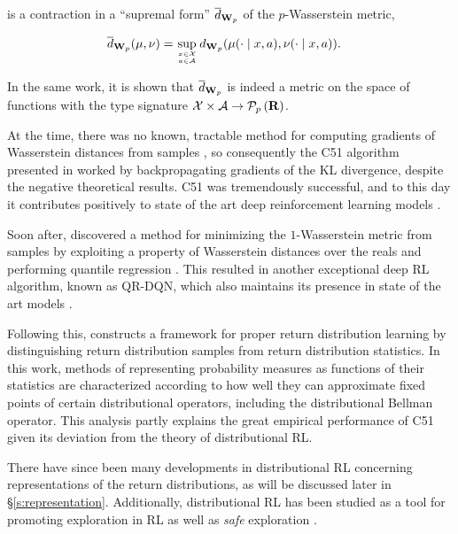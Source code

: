 is a contraction in a ``supremal form'' $\supremalwassermetric[p]$
of the $p$-Wasserstein metric,

\begin{align*}
  \supremalwassermetric[p](\mu, \nu) &= \sup_{x\in\mathcal{X}\atop
                                          a\in\mathcal{A}}\wassermetric[p](\mu(\cdot\mid
                                          x, a),\nu(\cdot\mid x, a)).
\end{align*}

In the same work, it is shown that $\supremalwassermetric[p]$ is
indeed a metric on the space of functions with the type signature
$\mathcal{X}\times\mathcal{A}\to\probset{\mathbf{R}}$.

At the time, there was no known, tractable method for computing
gradients of Wasserstein distances from samples
\citep{bellemare2017cramer}, so consequently the C51 algorithm
presented in \citet{Bellemare2017ADP} worked by backpropagating
gradients of the KL divergence, despite the negative theoretical
results. C51 was tremendously successful, and to this day it
contributes positively to state of the art deep reinforcement learning
models \citep{hessel2018rainbow}.

Soon after, \citet{Dabney2018DistributionalRL} discovered a method for
minimizing the
$1$-Wasserstein metric from samples by exploiting a property of Wasserstein
distances over the reals \citep[Theorem 2.1]{thorpeintroduction} and
performing quantile regression \citep{koenker1978regression}. This
resulted in another exceptional deep RL algorithm, known as QR-DQN,
which also maintains its presence in state of the art models
\citep{bellemare2020autonomous}.

Following this, \citet{Rowland48495} constructs a framework for proper
return distribution learning by distinguishing return distribution
samples from return distribution statistics. In this work, methods
of representing probability measures as functions of their statistics
are characterized according to how well they can approximate fixed
points of certain distributional operators, including the
distributional Bellman operator. This analysis partly explains the
great empirical performance of C51 given its deviation from the theory
of distributional RL.

There have since been many developments in distributional RL
concerning representations of the return distributions, as will be
discussed later in \S\ref{s:representation}. Additionally,
distributional RL has been studied as a tool for promoting exploration
in RL \citep{mavrin2019distributional} as well as \emph{safe}
exploration \citep{zhang2021safe}.

